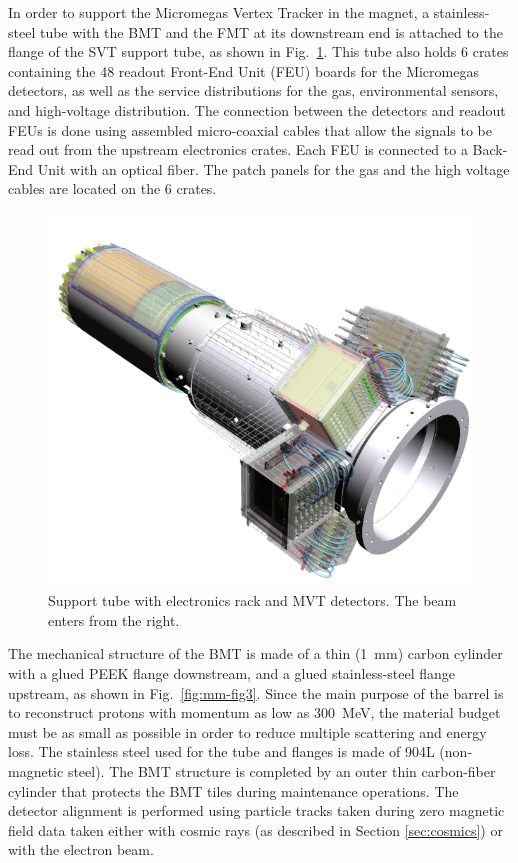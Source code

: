 In order to support the Micromegas Vertex Tracker in the magnet, a stainless-steel tube with the BMT and the FMT at its
downstream end is attached to the flange of the SVT support tube, as shown in Fig.~\ref{fig:mm-fig2}. This tube also
holds 6 crates containing the 48 readout Front-End Unit (FEU) boards for the Micromegas detectors, as well as the service
distributions for the gas, environmental sensors, and high-voltage distribution. The connection between the detectors and
readout FEUs is done using assembled micro-coaxial cables that allow the signals to be read out from the upstream
electronics crates. Each FEU is connected to a Back-End Unit with an optical fiber. The patch panels for the gas and the high
voltage cables are located on the 6 crates.

\begin{figure}[htb]
 \includegraphics[width=1.0\columnwidth,keepaspectratio]{images/fig2}
 \caption{Support tube with electronics rack and MVT detectors. The beam enters from the right.}
 \label{fig:mm-fig2}
\end{figure}

The mechanical structure of the BMT is made of a thin (1~mm) carbon cylinder with a glued PEEK flange downstream, and a
glued stainless-steel flange upstream, as shown in Fig.~\ref{fig:mm-fig3}. Since the main purpose of the barrel is to
reconstruct protons with momentum as low as 300~MeV, the material budget must be as small as possible in order to reduce
multiple scattering and energy loss. The stainless steel used for the tube and flanges is made of 904L (non-magnetic steel).
The BMT structure is completed by an outer thin carbon-fiber cylinder that protects the BMT tiles during maintenance
operations.  The detector alignment is performed using particle tracks taken during zero magnetic field data taken either
with cosmic rays (as described in Section \ref{sec:cosmics}) or with the electron beam.

